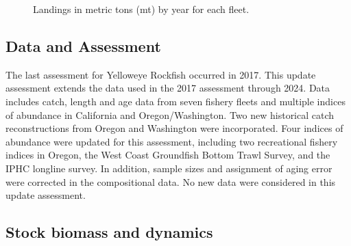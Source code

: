 \documentclass[
]{scrartcl}
\begin{document}
\endgroup

\begin{figure}


\caption{\label{fig-es-landings}Landings in metric tons (mt) by year for
each fleet.}

\end{figure}%

\clearpage

\subsection*{Data and Assessment}\label{data-and-assessment}

The last assessment for Yelloweye Rockfish occurred in 2017. This update
assessment extends the data used in the 2017 assessment through 2024.
Data includes catch, length and age data from seven fishery fleets and
multiple indices of abundance in California and Oregon/Washington. Two
new historical catch reconstructions from Oregon and Washington were
incorporated. Four indices of abundance were updated for this
assessment, including two recreational fishery indices in Oregon, the
West Coast Groundfish Bottom Trawl Survey, and the IPHC longline survey.
In addition, sample sizes and assignment of aging error were corrected
in the compositional data. No new data were considered in this update
assessment.

\subsection*{Stock biomass and
dynamics}\label{stock-biomass-and-dynamics}
\end{document}
